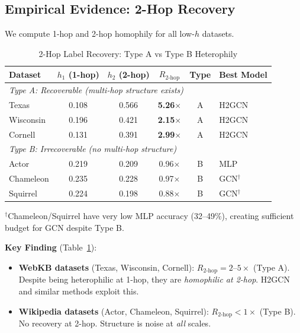 \subsection{Empirical Evidence: 2-Hop Recovery}

We compute 1-hop and 2-hop homophily for all low-$h$ datasets.

\begin{table}[t]
\centering
\caption{2-Hop Label Recovery: Type A vs Type B Heterophily}
\label{tab:2hop_recovery}
\begin{tabular}{@{}lccccl@{}}
\toprule
\textbf{Dataset} & \textbf{$h_1$ (1-hop)} & \textbf{$h_2$ (2-hop)} & \textbf{$R_{2\text{-hop}}$} & \textbf{Type} & \textbf{Best Model} \\
\midrule
\multicolumn{6}{l}{\textit{Type A: Recoverable (multi-hop structure exists)}} \\
Texas & 0.108 & 0.566 & \textbf{5.26$\times$} & A & H2GCN \\
Wisconsin & 0.196 & 0.421 & \textbf{2.15$\times$} & A & H2GCN \\
Cornell & 0.131 & 0.391 & \textbf{2.99$\times$} & A & H2GCN \\
\midrule
\multicolumn{6}{l}{\textit{Type B: Irrecoverable (no multi-hop structure)}} \\
Actor & 0.219 & 0.209 & 0.96$\times$ & B & MLP \\
Chameleon & 0.235 & 0.228 & 0.97$\times$ & B & GCN$^\dag$ \\
Squirrel & 0.224 & 0.198 & 0.88$\times$ & B & GCN$^\dag$ \\
\bottomrule
\end{tabular}
\vspace{1mm}
\raggedright\small $^\dag$Chameleon/Squirrel have very low MLP accuracy (32--49\%), creating sufficient budget for GCN despite Type B.
\end{table}

\textbf{Key Finding} (Table~\ref{tab:2hop_recovery}):
\begin{itemize}
    \item \textbf{WebKB datasets} (Texas, Wisconsin, Cornell): $R_{2\text{-hop}} = 2$--$5\times$ (Type A). Despite being heterophilic at 1-hop, they are \textit{homophilic at 2-hop}. H2GCN and similar methods exploit this.

    \item \textbf{Wikipedia datasets} (Actor, Chameleon, Squirrel): $R_{2\text{-hop}} < 1\times$ (Type B). No recovery at 2-hop. Structure is noise at \textit{all} scales.
\end{itemize}

